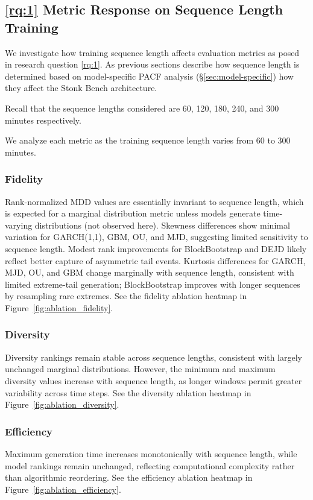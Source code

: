 \documentclass[sigconf]{acmart}
\begin{document}
  \subsection{\ref{rq:1} Metric Response on Sequence Length Training}
    We investigate how training sequence length affects evaluation
    metrics as posed in research question \ref{rq:1}.
    As previous sections describe how sequence length is determined
    based on model-specific PACF analysis (§\ref{sec:model-specific})
    how they affect the Stonk Bench architecture.

    Recall that the sequence lengths considered are 60, 120, 180, 240,
    and 300 minutes respectively.

  We analyze each metric as the training sequence length varies from
  60 to 300 minutes.

\subsubsection{Fidelity}
  Rank-normalized MDD values are essentially invariant to sequence
  length, which is expected for a marginal distribution metric unless
  models generate time-varying distributions (not observed here).
  Skewness differences show minimal variation for GARCH(1,1), GBM, OU,
  and MJD, suggesting limited sensitivity to sequence length. Modest
  rank improvements for BlockBootstrap and DEJD likely reflect better
  capture of asymmetric tail events. Kurtosis differences for GARCH,
  MJD, OU, and GBM change marginally with sequence length, consistent
  with limited extreme-tail generation; BlockBootstrap improves with
  longer sequences by resampling rare extremes. See the fidelity
  ablation heatmap in Figure~\ref{fig:ablation_fidelity}.

\subsubsection{Diversity}
  Diversity rankings remain stable across sequence lengths, consistent
  with largely unchanged marginal distributions. However, the minimum
  and maximum diversity values increase with sequence length, as longer
  windows permit greater variability across time steps. See the
  diversity ablation heatmap in Figure~\ref{fig:ablation_diversity}.

\subsubsection{Efficiency}
  Maximum generation time increases monotonically with sequence length,
  while model rankings remain unchanged, reflecting computational
  complexity rather than algorithmic reordering. See the efficiency
  ablation heatmap in Figure~\ref{fig:ablation_efficiency}.
\end{document}
